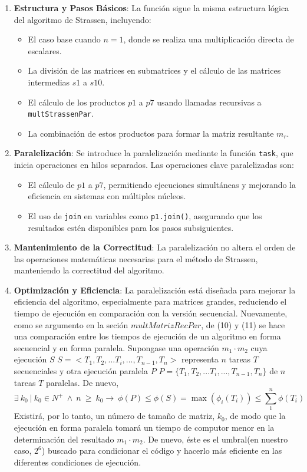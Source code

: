 \documentclass[12pt, a4paper]{article}
\begin{document}
\begin{enumerate}
    \item \textbf{Estructura y Pasos Básicos}: La función sigue la misma estructura lógica del algoritmo de Strassen, incluyendo:
    \begin{itemize}
        \item El caso base cuando $n = 1$, donde se realiza una multiplicación directa de escalares.
        \item La división de las matrices en submatrices y el cálculo de las matrices intermedias $s1$ a $s10$.
        \item El cálculo de los productos $p1$ a $p7$ usando llamadas recursivas a \texttt{multStrassenPar}.
        \item La combinación de estos productos para formar la matriz resultante $m_r$.
    \end{itemize}
    
    \item \textbf{Paralelización}: Se introduce la paralelización mediante la función \texttt{task}, que inicia operaciones en hilos separados. Las operaciones clave paralelizadas son:
    \begin{itemize}
        \item El cálculo de $p1$ a $p7$, permitiendo ejecuciones simultáneas y mejorando la eficiencia en sistemas con múltiples núcleos.
        \item El uso de \texttt{join} en variables como \texttt{p1.join()}, asegurando que los resultados estén disponibles para los pasos subsiguientes.
    \end{itemize}

    \item \textbf{Mantenimiento de la Correctitud}: La paralelización no altera el orden de las operaciones matemáticas necesarias para el método de Strassen, manteniendo la correctitud del algoritmo.

    \item \textbf{Optimización y Eficiencia}: La paralelización está diseñada para mejorar la eficiencia del algoritmo, especialmente para matrices grandes, reduciendo el tiempo de ejecución en comparación con la versión secuencial.
    Nuevamente, como se argumento en la seción $multMatrizRecPar$, de (10) y (11) se hace una comparación entre los tiempos de ejecución de un algoritmo en forma secuencial y en forma paralela.
    Supongase una operación $m_1 \cdot m_2$ cuya ejecución $S$ 
    $S=<T_1,T_2,...T_i,...,T_{n-1},T_{n}>$ representa $n$ tareas $T$ secuenciales y otra ejecución paralela $P$ $P=\{T_1,T_2,...T_i,...,T_{n-1},T_{n}\}$  de $n$ tareas $T$ paralelas. De nuevo, 
   \[
    \exists~k_0~|~k_0 \in N^+~\land~n~\geq~k_0 \rightarrow ~\phi(P) \leq \phi(S) = \max (\phi_i(T_i)) \leq \sum_{1}^{n}\phi(T_i)   
   \]
   Existirá, por lo tanto, un número de tamaño de matriz, $k_0$, de modo que la ejecución en forma paralela tomará un tiempo de computor menor en la determinación del resultado $m_1 \cdot m_2$.
   De nuevo, éste es el umbral(en nuestro caso, $2^6$) buscado para condicionar el código y hacerlo más eficiente en las diferentes condiciones de ejecución. 
\end{enumerate}
\end{document}

